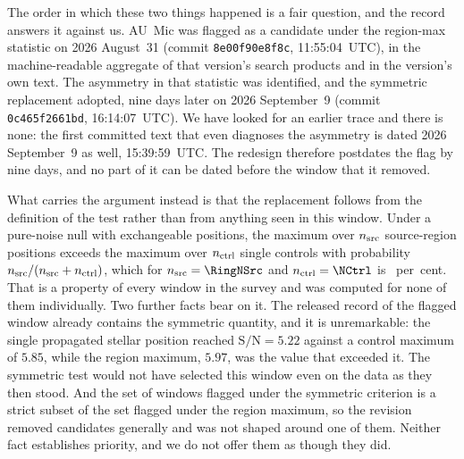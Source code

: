 
The order in which these two things happened is a fair question, and the record
answers it against us. AU~Mic was flagged as a candidate under the region-max
statistic on 2026 August~31 (commit \texttt{8e00f90e8f8c}, 11:55:04~UTC), in the
machine-readable aggregate of that version's search products and in the version's
own text. The asymmetry in that statistic was identified, and the symmetric
replacement adopted, nine days later on 2026 September~9 (commit
\texttt{0c465f2661bd}, 16:14:07~UTC). We have looked for an earlier trace and
there is none: the first committed text that even diagnoses the asymmetry is
dated 2026 September~9 as well, 15:39:59~UTC. The redesign therefore postdates
the flag by nine days, and no part of it can be dated before the window that it
removed.

What carries the argument instead is that the replacement follows from the
definition of the test rather than from anything seen in this window. Under a
pure-noise null with exchangeable positions, the maximum over $n_{\rm src}$
source-region positions exceeds the maximum over $n_{\rm ctrl}$ single controls
with probability $n_{\rm src}/(n_{\rm src}+n_{\rm ctrl})$, which for
$n_{\rm src}=\RingNSrc$ and $n_{\rm ctrl}=\NCtrl$ is
\AsymExpectPct{}~per~cent. That is a property of every window in the survey and
was computed for none of them individually. Two further facts bear on it. The
released record of the flagged window already contains the symmetric quantity,
and it is unremarkable: the single propagated stellar position reached
$\mathrm{S/N}=5.22$ against a control maximum of $5.85$, while the region
maximum, $5.97$, was the value that exceeded it. The symmetric test would not
have selected this window even on the data as they then stood. And the set of
windows flagged under the symmetric criterion is a strict subset of the set
flagged under the region maximum, so the revision removed candidates generally
and was not shaped around one of them. Neither fact establishes priority, and we
do not offer them as though they did.


